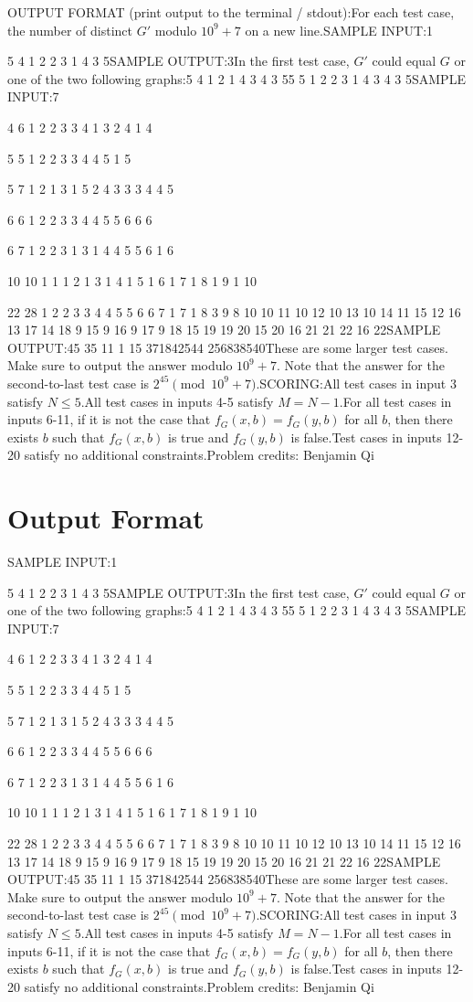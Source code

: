 \documentclass[12pt]{article}
\begin{document}
OUTPUT FORMAT (print output to the terminal / stdout):For each test case, the number of distinct $G'$ modulo $10^9+7$ on a new line.SAMPLE INPUT:1

5 4
1 2
2 3
1 4
3 5SAMPLE OUTPUT:3In the first test case, $G'$ could equal $G$ or one of the two following graphs:5 4
1 2
1 4
3 4
3 55 5
1 2
2 3
1 4
3 4
3 5SAMPLE INPUT:7

4 6
1 2
2 3
3 4
1 3
2 4
1 4

5 5
1 2
2 3
3 4
4 5
1 5

5 7
1 2
1 3
1 5
2 4
3 3
3 4
4 5

6 6
1 2
2 3
3 4
4 5
5 6
6 6

6 7
1 2
2 3
1 3
1 4
4 5
5 6
1 6

10 10
1 1
1 2
1 3
1 4
1 5
1 6
1 7
1 8
1 9
1 10

22 28
1 2
2 3
3 4
4 5
5 6
6 7
1 7
1 8
3 9
8 10
10 11
10 12
10 13
10 14
11 15
12 16
13 17
14 18
9 15
9 16
9 17
9 18
15 19
19 20
15 20
16 21
21 22
16 22SAMPLE OUTPUT:45
35
11
1
15
371842544
256838540These are some larger test cases. Make sure to output the answer modulo
$10^9+7$. Note that the answer for the second-to-last test case is
$2^{45}\pmod{10^9+7}$.SCORING:All test cases in input 3 satisfy $N\le 5$.All test cases in inputs 4-5 satisfy $M=N-1$.For all test cases in inputs 6-11, if it is not the case that
$f_G(x,b)=f_G(y,b)$ for all $b$, then there exists $b$ such that $f_G(x,b)$ is
true and $f_G(y,b)$ is false.Test cases in inputs 12-20 satisfy no additional constraints.Problem credits: Benjamin Qi

\section*{Output Format}
SAMPLE INPUT:1

5 4
1 2
2 3
1 4
3 5SAMPLE OUTPUT:3In the first test case, $G'$ could equal $G$ or one of the two following graphs:5 4
1 2
1 4
3 4
3 55 5
1 2
2 3
1 4
3 4
3 5SAMPLE INPUT:7

4 6
1 2
2 3
3 4
1 3
2 4
1 4

5 5
1 2
2 3
3 4
4 5
1 5

5 7
1 2
1 3
1 5
2 4
3 3
3 4
4 5

6 6
1 2
2 3
3 4
4 5
5 6
6 6

6 7
1 2
2 3
1 3
1 4
4 5
5 6
1 6

10 10
1 1
1 2
1 3
1 4
1 5
1 6
1 7
1 8
1 9
1 10

22 28
1 2
2 3
3 4
4 5
5 6
6 7
1 7
1 8
3 9
8 10
10 11
10 12
10 13
10 14
11 15
12 16
13 17
14 18
9 15
9 16
9 17
9 18
15 19
19 20
15 20
16 21
21 22
16 22SAMPLE OUTPUT:45
35
11
1
15
371842544
256838540These are some larger test cases. Make sure to output the answer modulo
$10^9+7$. Note that the answer for the second-to-last test case is
$2^{45}\pmod{10^9+7}$.SCORING:All test cases in input 3 satisfy $N\le 5$.All test cases in inputs 4-5 satisfy $M=N-1$.For all test cases in inputs 6-11, if it is not the case that
$f_G(x,b)=f_G(y,b)$ for all $b$, then there exists $b$ such that $f_G(x,b)$ is
true and $f_G(y,b)$ is false.Test cases in inputs 12-20 satisfy no additional constraints.Problem credits: Benjamin Qi
\end{document}
